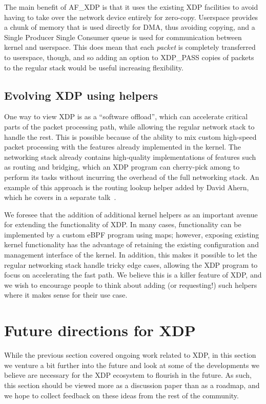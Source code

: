 \documentclass[sigconf]{acmart}
\begin{document}
The main benefit of AF\_XDP is that it uses the existing XDP facilities to avoid
having to take over the network device entirely for zero-copy. Userspace
provides a chunk of memory that is used directly for DMA, thus avoiding copying,
and a Single Producer Single Consumer queue is used for communication between
kernel and userspace. This does mean that each \emph{packet} is completely
transferred to userspace, though, and so adding an option to XDP\_PASS copies of
packets to the regular stack would be useful increasing flexibility.


\subsection{Evolving XDP using helpers}
\label{sec:evolving-xdp}

One way to view XDP is as a ``software offload'', which can accelerate critical
parts of the packet processing path, while allowing the regular network stack to
handle the rest. This is possible because of the ability to mix custom
high-speed packet processing with the features already implemented in the
kernel. The networking stack already contains high-quality implementations of
features such as routing and bridging, which an XDP program can cherry-pick
among to perform its tasks without incurring the overhead of the full networking
stack. An example of this approach is the routing lookup helper added by David
Ahern, which he covers in a separate talk~\cite{ahern-routing}.

We foresee that the addition of additional kernel helpers as an important avenue
for extending the functionality of XDP. In many cases, functionality can be
implemented by a custom eBPF program using maps; however, exposing existing
kernel functionality has the advantage of retaining the existing configuration
and management interface of the kernel. In addition, this makes it possible to
let the regular networking stack handle tricky edge cases, allowing the XDP
program to focus on accelerating the fast path. We believe this is a killer
feature of XDP, and we wish to encourage people to think about adding (or
requesting!) such helpers where it makes sense for their use case.

\section{Future directions for XDP}

While the previous section covered ongoing work related to XDP, in this section
we venture a bit further into the future and look at some of the developments we
believe are necessary for the XDP ecosystem to flourish in the future. As such,
this section should be viewed more as a discussion paper than as a roadmap, and
we hope to collect feedback on these ideas from the rest of the community.
\end{document}
